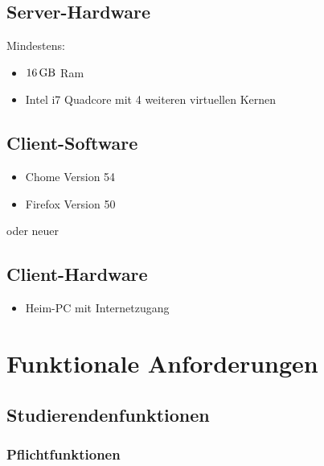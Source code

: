 \documentclass[parskip=full]{scrartcl}
\begin{document}
\subsection{Server-Hardware}
Mindestens:
\begin{itemize} 
  \item $\SI{16}{\giga\byte}$ Ram
  \item Intel i7 Quadcore mit 4 weiteren virtuellen Kernen 
\end{itemize}

\subsection{Client-Software}
\begin{itemize}
  \item Chome Version 54
  \item Firefox Version 50
\end{itemize}
oder neuer
\subsection{Client-Hardware}
\begin{itemize}
  \item Heim-PC mit Internetzugang %
\end{itemize}
\section{Funktionale Anforderungen}

\subsection{Studierendenfunktionen}

\subsubsection{Pflichtfunktionen}
\end{document}
